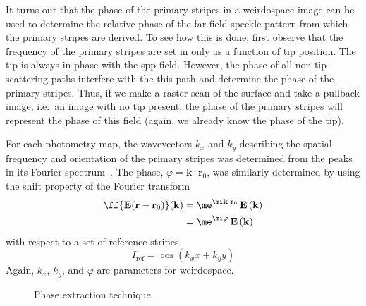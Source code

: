 It turns out that the phase of the primary stripes in a weirdospace image
can be used to determine the relative phase of the far field speckle
pattern from which the primary stripes are derived.  To see how this is
done, first observe that the frequency of the primary stripes are set in
 only as a function of tip position.  The tip
is always in phase with the \gls{spp} field.  However, the phase of all
non-tip-scattering paths interfere with the this path and determine the
phase of the primary stripes.  Thus, if we make a raster scan of the
surface and take a pullback image, i.e.\ an image with no tip present, the
phase of the primary stripes will represent the phase of this field (again,
we already know the phase of the tip).

For each photometry map, the wavevectors $k_x$ and $k_y$ describing the
spatial frequency and orientation of the primary stripes was determined
from the peaks in its Fourier spectrum~\cite{huntley1986speckle}.  The
phase, $\varphi=\mathbf{k}\cdot\mathbf{r}_0$, was similarly determined
by using the shift property of the Fourier transform
\begin{align}
  \ff{\mathbf{E}(\mathbf{r}-\mathbf{r}_0)}(\mathbf{k}) & =
  \me^{\mi \mathbf{k}\cdot \mathbf{r}_0}\,
  \mathbf{E}\left(\mathbf{k}\right)\\
  & = \me^{\mi \varphi}\, \mathbf{E}\left(\mathbf{k}\right)
\end{align}
with respect to a set of reference stripes
\begin{equation}
  I_\mathrm{ref} = \cos(k_x x + k_y y)
\end{equation}
Again, $k_x$, $k_y$, and $\varphi$ are parameters for weirdospace.


\begin{figure}
  \centering
  \caption{Phase extraction technique.}
  \label{fig:phaseextractiontechnique}
\end{figure}


